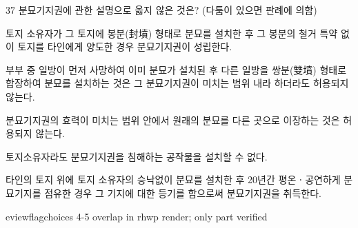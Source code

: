 \begin{question}{37}
분묘기지권에 관한 설명으로 옳지 않은 것은? (다툼이 있으면 판례에 의함)
\begin{choices}
  \item 토지 소유자가 그 토지에 봉분(封墳) 형태로 분묘를 설치한 후 그 봉분의 철거 특약 없이 토지를 타인에게 양도한 경우 분묘기지권이 성립한다.
  \item 부부 중 일방이 먼저 사망하여 이미 분묘가 설치된 후 다른 일방을 쌍분(雙墳) 형태로 합장하여 분묘를 설치하는 것은 그 분묘기지권이 미치는 범위 내라 하더라도 허용되지 않는다.
  \item 분묘기지권의 효력이 미치는 범위 안에서 원래의 분묘를 다른 곳으로 이장하는 것은 허용되지 않는다.
  \item 토지소유자라도 분묘기지권을 침해하는 공작물을 설치할 수 없다.
  \item 타인의 토지 위에 토지 소유자의 승낙없이 분묘를 설치한 후 20년간 평온ㆍ공연하게 분묘기지를 점유한 경우 그 기지에 대한 등기를 함으로써 분묘기지권을 취득한다.
\end{choices}

eviewflag{choices 4-5 overlap in rhwp render; only part verified}
\end{question}
